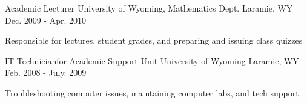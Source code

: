 \begin{cventries}

\begin{displaySection}
    \cventry
    {Academic Lecturer} %
    {University of Wyoming, Mathematics Dept.} %
    {Laramie, WY} %
    {Dec. 2009 - Apr. 2010} %
    { %
    \begin{cvitems}
    \item {Responsible for lectures, student grades, and preparing and issuing class quizzes}
    \end{cvitems}
    }


    \cventry
    {IT Technicianfor Academic Support Unit} %
    {University of Wyoming} %
    {Laramie, WY} %
    {Feb. 2008 - July. 2009} %
    { %
    \begin{cvitems}
    \item {Troubleshooting computer issues, maintaining computer labs, and tech support}
    \end{cvitems}
    }

\end{displaySection}

\end{cventries}
